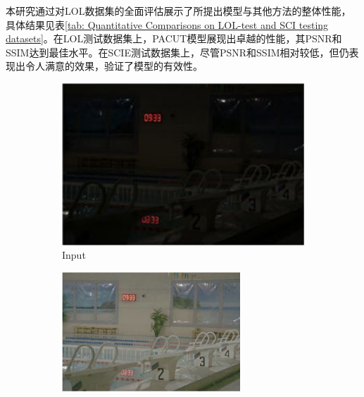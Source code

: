 \documentclass[a4paper]{ctexart}
\begin{document}
本研究通过对LOL数据集的全面评估展示了所提出模型与其他方法的整体性能，具体结果见表\ref{tab: Quantitative Comparisons on LOL-test and SCI testing datasets}。在LOL测试数据集上，PACUT模型展现出卓越的性能，其PSNR和SSIM达到最佳水平。在SCIE测试数据集上，尽管PSNR和SSIM相对较低，但仍表现出令人满意的效果，验证了模型的有效性。

\begin{figure}[htb] 
	\centering 
	
	\begin{subfigure}{0.19\textwidth}
		\includegraphics[width=\linewidth]{picture/LLIE/Efficent/Input}
		\captionsetup{font=scriptsize}
		\caption{Input}
		\label{fig: Input}
	\end{subfigure}
	\begin{subfigure}{0.19\textwidth}
		\includegraphics[width=\linewidth]{picture/LLIE/Efficent/LightenNet}

\end{subfigure}
\end{figure}
\end{document}
